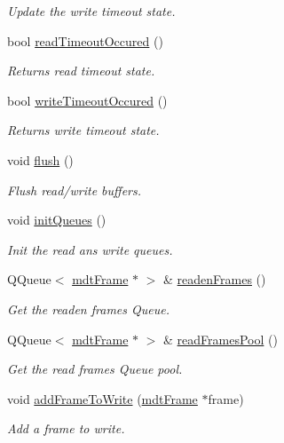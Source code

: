 \begin{DoxyCompactItemize}
\begin{DoxyCompactList}\small\item\em Update the write timeout state. \end{DoxyCompactList}\item 
bool \hyperlink{classmdt_abstract_port_aec94143165e486cbbe6e0979be887c7e}{readTimeoutOccured} ()
\begin{DoxyCompactList}\small\item\em Returns read timeout state. \end{DoxyCompactList}\item 
bool \hyperlink{classmdt_abstract_port_a7c05a1abe77f0c3c334016c6ad866f67}{writeTimeoutOccured} ()
\begin{DoxyCompactList}\small\item\em Returns write timeout state. \end{DoxyCompactList}\item 
void \hyperlink{classmdt_abstract_port_abde440c49b95833f821e1333c40a7398}{flush} ()
\begin{DoxyCompactList}\small\item\em Flush read/write buffers. \end{DoxyCompactList}\item 
void \hyperlink{classmdt_abstract_port_adf06d095d6c3e6ce939a3998bcf8b829}{initQueues} ()
\begin{DoxyCompactList}\small\item\em Init the read ans write queues. \end{DoxyCompactList}\item 
QQueue$<$ \hyperlink{classmdt_frame}{mdtFrame} $\ast$ $>$ \& \hyperlink{classmdt_abstract_port_a05356a33dc546a11d2794a0419d749e0}{readenFrames} ()
\begin{DoxyCompactList}\small\item\em Get the readen frames Queue. \end{DoxyCompactList}\item 
QQueue$<$ \hyperlink{classmdt_frame}{mdtFrame} $\ast$ $>$ \& \hyperlink{classmdt_abstract_port_a3850ab819a8fc5dad22af14b74c45274}{readFramesPool} ()
\begin{DoxyCompactList}\small\item\em Get the read frames Queue pool. \end{DoxyCompactList}\item 
void \hyperlink{classmdt_abstract_port_a9a69eb2fc07d551ab37c011487fa319d}{addFrameToWrite} (\hyperlink{classmdt_frame}{mdtFrame} $\ast$frame)
\begin{DoxyCompactList}\small\item\em Add a frame to write. \end{DoxyCompactList}\item 

\end{DoxyCompactItemize}
